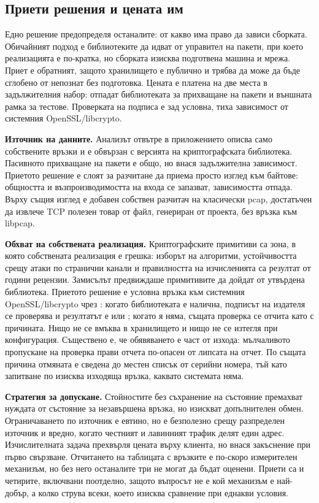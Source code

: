\subsection{Приети решения и цената им}
\label{subsec:choices}

Едно решение предопределя останалите: от какво има право да зависи сборката. Обичайният подход
е библиотеките да идват от управител на пакети, при което реализацията е по-кратка, но сборката
изисква подготвена машина и мрежа. Приет е обратният, защото хранилището е публично и трябва да
може да бъде сглобено от непознат без подготовка. Цената е платена на две места в задължителния
набор: отпадат библиотеката за прихващане на пакети и външната рамка за тестове. Проверката на
подписа е зад условна, тиха зависимост от системния OpenSSL/libcrypto.

\textbf{Източник на данните.} Анализът отвътре в приложението описва само собствените връзки и е
обвързан с версията на криптографската библиотека. Пасивното прихващане на пакети е общо, но
внася задължителна зависимост. Приетото решение е слоят за разчитане да приема просто изглед към
байтове: общността и възпроизводимостта на входа се запазват, зависимостта отпада. Върху същия
изглед е добавен собствен разчитач на класически pcap, достатъчен да извлече TCP полезен товар от
файл, генериран от проекта, без връзка към libpcap.

\textbf{Обхват на собствената реализация.} Криптографските примитиви са зона, в която
собствената реализация е грешка: изборът на алгоритми, устойчивостта срещу атаки по странични
канали и правилността на изчисленията са резултат от години рецензии. Замисълът предвиждаше
примитивите да дойдат от утвърдена библиотека. Приетото решение е условна връзка към системния
OpenSSL/libcrypto чрез : когато библиотеката е налична,
подписът на издателя се проверява и резултатът е  или ; когато я няма,
същата проверка се отчита като  с причината. Нищо не се вмъква в хранилището и нищо
не се изтегля при конфигурация. Съществено е, че обявяването е част от изхода: мълчаливото
пропускане на проверка прави отчета по-опасен от липсата на отчет. По същата причина отмяната е
сведена до местен списък от серийни номера, тъй като запитване по \cite{rfc6960} изисква
изходяща връзка, каквато системата няма.

\textbf{Стратегия за допускане.} Стойностите без съхранение на състояние \cite{rfc4987}
премахват нуждата от състояние за незавършена връзка, но изискват допълнителен обмен.
Ограничаването по източник е евтино, но е безполезно срещу разпределен източник и вредно, когато
честният и лавинният трафик делят един адрес. Изчислителната задача прехвърля цената върху
клиента, но внася закъснение при първо свързване. Отчитането на таблицата с връзките е по-скоро
измерителен механизъм, но без него останалите три не могат да бъдат оценени. Приети са и
четирите, включвани поотделно, защото въпросът не е кой механизъм е най-добър, а колко струва
всеки, което изисква сравнение при еднакви условия.

